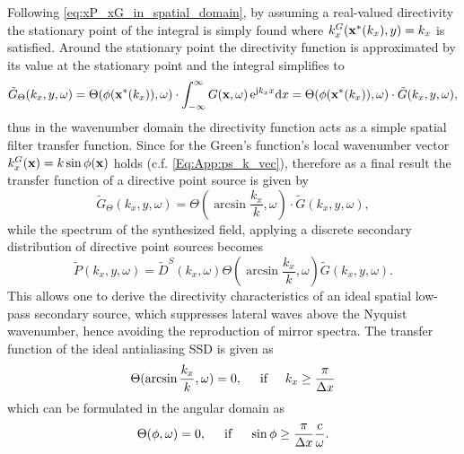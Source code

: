 Following \eqref{eq:xP_xG_in_spatial_domain}, by assuming a real-valued directivity the stationary point of the integral is simply found where $k_x^{G}(\mathbf{x}^*(k_x),y) = k_x$ is satisfied.
Around the stationary point the directivity function is approximated by its value at the stationary point and the integral simplifies to
\begin{equation}
\tilde{G}_{\Theta}(k_x,y,\omega) = \Theta(\phi(\mathbf{x}^*(k_x)),\omega) \cdot \int_{-\infty}^{\infty} 
G(\mathbf{x},\omega) \, \mathrm{e}^{\mathrm{j} k_x x} \mathrm{d} x =
\Theta(\phi(\mathbf{x}^*(k_x)),\omega) \cdot 
\tilde{G}(k_x,y,\omega),
\end{equation}
thus in the wavenumber domain the directivity function acts as a simple spatial filter transfer function.
Since for the Green's function's local wavenumber vector $k_x^{G}(\mathbf{x}) = k \sin \phi(\mathbf{x})$ holds (c.f. \eqref{Eq:App:ps_k_vec}), therefore as a final result the transfer function of a directive point source is given by
\begin{equation}
\tilde{G}_{\Theta}(k_x,y,\omega) = 
\Theta(\arcsin \frac{k_x}{k},\omega) \cdot 
\tilde{G}(k_x,y,\omega),
\end{equation}
while the spectrum of the synthesized field, applying a discrete secondary distribution of directive point sources becomes
\begin{equation}
\tilde{P}(k_x,y,\omega) = \tilde{D}^S(k_x,\omega) \Theta(\arcsin \frac{k_x}{k},\omega) \tilde{G}(k_x,y,\omega).
\end{equation}
This allows one to derive the directivity characteristics of an ideal spatial low-pass secondary source, which suppresses lateral waves above the Nyquist wavenumber, hence avoiding the reproduction of mirror spectra.
The transfer function of the ideal antialiasing SSD is given as
\begin{equation}
\Theta(\arcsin \frac{k_x}{k},\omega) = 0, \hspace{5mm} \text{if} \hspace{5mm} k_x \geq \frac{\pi}{\Delta x}
\end{equation}
which can be formulated in the angular domain as
\begin{equation}
\Theta(\phi,\omega) = 0, \hspace{5mm} \text{if} \hspace{5mm} \sin \phi \geq \frac{\pi}{\Delta x} \frac{c}{\omega}.
\end{equation}
